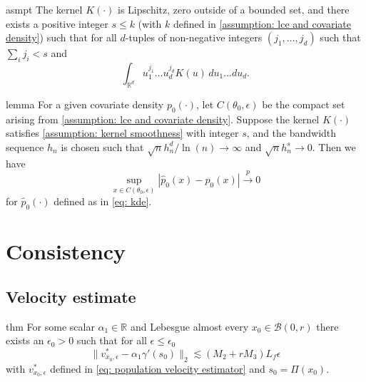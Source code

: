 \documentclass[11pt]{article}
\begin{document}
\begin{restatable}{asmpt}{} \label{assumption: kernel smoothness}
    The kernel $K(\cdot)$ is Lipschitz, zero outside of a bounded set, and there exists a positive integer $s \leq k$ (with $k$ defined in \cref{assumption: lce and covariate density}) such that for all $d$-tuples of non-negative integers $(j_1, \dots, j_d)$ such that $\sum_i j_i < s$ and
    \[\int_{\mathbb{R}^d}u_1^{j_1}\dots u_d^{j_d}K(u)\,du_1\dots du_d.\]
\end{restatable}


\begin{restatable}{lemma}{} \label{lemma: uniform convergence of kde}
    For a given covariate density $p_0(\cdot)$, let $C(\theta_0, \epsilon)$ be the compact set arising from \cref{assumption: lce and covariate density}. Suppose the kernel $K(\cdot)$ satisfies \cref{assumption: kernel smoothness} with integer $s$, and the bandwidth sequence $h_n$ is chosen such that $\sqrt{n}h_n^d/\ln(n) \rightarrow \infty$ and $\sqrt{n}h_n^s \rightarrow 0$. Then we have
    \begin{equation}
        \sup_{x \in C(\theta_0, \epsilon)} \left|\hat{p}_0(x) - p_0(x)\right| \overset{p}{\rightarrow} 0
    \end{equation}
    for $\hat{p}_0(\cdot)$ defined as in \cref{eq: kde}.
\end{restatable}

\section{Consistency}

\subsection{Velocity estimate}

\begin{restatable}{thm}{}\label{thm: population prop}
    For some scalar $\alpha_1 \in \mathbb{R}$ and Lebesgue almost every $x_0 \in \mathcal{B}(0, r)$ there exists an $\epsilon_0 > 0$ such that for all $\epsilon \leq \epsilon_0$ 
    \[\|v^*_{x_0, \epsilon} - \alpha_1\gamma'(s_0)\|_2 \lesssim (M_2+rM_3)L_f\epsilon\]
    with $v^*_{x_0, \epsilon}$ defined in \cref{eq: population velocity estimator} and $s_0 = \Pi(x_0)$.
\end{restatable}
\end{document}
